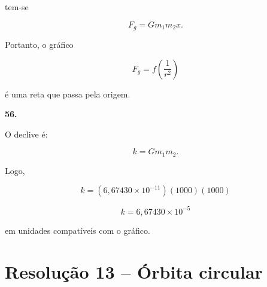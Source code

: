 \documentclass[11pt,a4paper]{article}
\begin{document}
\begin{solucaobox}[Questões 52--56]
		tem-se
		
		\[
		F_g=
		Gm_1m_2x.
		\]
		
		Portanto, o gráfico
		
		\[
		F_g=f\left(\frac1{r^2}\right)
		\]
		
		é uma reta que passa pela origem.
		
		\vspace{3mm}
		
		\textbf{56.}
		
		O declive é:
		
		\[
		k=Gm_1m_2.
		\]
		
		Logo,
		
		\[
		k=
		(6{,}67430\times10^{-11})
		(1000)(1000)
		\]
		
		\[
		\boxed{
			k=
			6{,}67430\times10^{-5}
		}
		\]
		
		em unidades compatíveis com o gráfico.
		
	\end{solucaobox}
	
	\section*{Resolução 13 -- Órbita circular}
	
\end{document}
